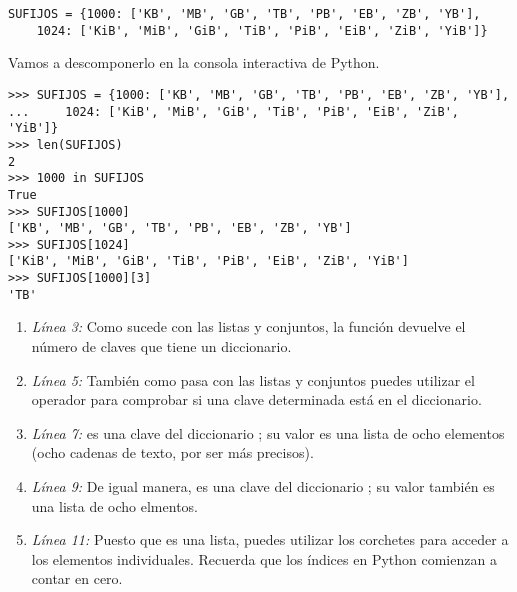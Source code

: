\noindent\begin{minipage}{\textwidth}
\begin{lstlisting}[mathescape=True]
SUFIJOS = {1000: ['KB', 'MB', 'GB', 'TB', 'PB', 'EB', 'ZB', 'YB'],
    1024: ['KiB', 'MiB', 'GiB', 'TiB', 'PiB', 'EiB', 'ZiB', 'YiB']}
\end{lstlisting}
\end{minipage}

Vamos a descomponerlo en la consola interactiva de Python.

\noindent\begin{minipage}{\textwidth}
\begin{lstlisting}[mathescape=True]
>>> SUFIJOS = {1000: ['KB', 'MB', 'GB', 'TB', 'PB', 'EB', 'ZB', 'YB'],
...     1024: ['KiB', 'MiB', 'GiB', 'TiB', 'PiB', 'EiB', 'ZiB', 'YiB']}
>>> len(SUFIJOS)
2
>>> 1000 in SUFIJOS
True
>>> SUFIJOS[1000]
['KB', 'MB', 'GB', 'TB', 'PB', 'EB', 'ZB', 'YB']
>>> SUFIJOS[1024]
['KiB', 'MiB', 'GiB', 'TiB', 'PiB', 'EiB', 'ZiB', 'YiB']
>>> SUFIJOS[1000][3]
'TB'
\end{lstlisting}
\end{minipage}

\begin{enumerate}

\item \emph{Línea 3:} Como sucede con las listas y conjuntos, la función  devuelve el número de claves que tiene un diccionario.

\item \emph{Línea 5:} También como pasa con las listas y conjuntos puedes utilizar el operador  para comprobar si una clave determinada está en el diccionario.

\item \emph{Línea 7:}  es una clave del diccionario ; su valor es una lista de ocho elementos (ocho cadenas de texto, por ser más precisos).

\item \emph{Línea 9:} De igual manera,  es una clave del diccionario ; su valor también es una lista de ocho elmentos.

\item \emph{Línea 11:} Puesto que  es una lista, puedes utilizar los corchetes para acceder a los elementos individuales. Recuerda que los índices en Python comienzan a contar en cero.

\end{enumerate}

